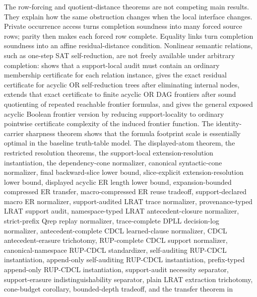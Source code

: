 \documentclass[11pt]{article}
\theoremstyle{definition}
\begin{document}
The row-forcing and quotient-distance theorems are not competing main results.  They explain how the same obstruction changes when the local interface changes.  Private occurrence access turns completion soundness into many forced source rows; parity then makes each forced row complete.  Equality links turn completion soundness into an affine residual-distance condition.  Nonlinear semantic relations, such as one-step SAT self-reduction, are not freely available under arbitrary completion:  shows that a support-local audit must contain an ordinary membership certificate for each relation instance,  gives the exact residual certificate for acyclic OR self-reduction trees after eliminating internal nodes,  extends that exact certificate to finite acyclic OR DAG frontiers after sound quotienting of repeated reachable frontier formulas, and  gives the general exposed acyclic Boolean frontier version by reducing support-locality to ordinary pointwise certificate complexity of the induced frontier function.  The identity-carrier sharpness theorem shows that the formula footprint scale is essentially optimal in the baseline truth-table model.  The displayed-atom theorem, the restricted resolution theorems, the support-local extension-resolution instantiation, the dependency-cone normalizer, canonical syntactic-cone normalizer, final backward-slice lower bound, slice-explicit extension-resolution lower bound, displayed acyclic ER length lower bound, expansion-bounded compressed ER transfer, macro-compressed ER reuse tradeoff, support-declared macro ER normalizer, support-audited LRAT trace normalizer, provenance-typed LRAT support audit, namespace-typed LRAT antecedent-closure normalizer, strict-prefix Qrep replay normalizer, trace-complete DPLL decision-log normalizer, antecedent-complete CDCL learned-clause normalizer, CDCL antecedent-erasure trichotomy, RUP-complete CDCL support normalizer, canonical-namespace RUP-CDCL standardizer, self-auditing RUP-CDCL instantiation, append-only self-auditing RUP-CDCL instantiation, prefix-typed append-only RUP-CDCL instantiation, support-audit necessity separator, support-erasure indistinguishability separator, plain LRAT extraction trichotomy, cone-budget corollary, bounded-depth tradeoff, and the transfer theorem in 
\end{document}
